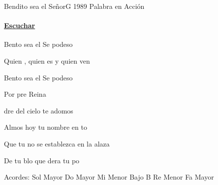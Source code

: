 \documentclass[12pt, spanish]{book}
\newcommand{\NotCCLIed}{\relax}
\begin{document}
    \begin{song}{Bendito sea el Señor}{G}
        {1989} %
        {Palabra en Acción}
        {} %
        {} %
        \ifChordBk
        \paragraph{\mbox{}\hfill\protect\href{https://open.spotify.com/intl-es/track/1zVunzzcTbEairRLe3E6M8}{Escuchar}\mbox{}\hfill}
        \fi


            \begin{SBChorus}
            Bento sea el Se  podeso

            Quien , quien es y quien ven

            Bento sea el Se  podeso

            Por pre Reina
            \end{SBChorus}


            \begin{SBOpGroup}
                dre del cielo te adomos

                Almos hoy tu nombre en to

                Que tu no se establezca en la alaza

                De tu blo que dera tu po
            \end{SBOpGroup}

            \ifChordBk
            \begin{SBOpGroup}
                Acordes:\break
                \upchord{\G}\qquad Sol Mayor \hfill
                \upchord{\C}\qquad Do Mayor \hfill\null\break
                \upchord{\EmB}\qquad Mi Menor Bajo B \hfill
                \upchord{\Dm}\qquad Re Menor \hfill\null\break
                \upchord{\F}\qquad Fa Mayor \hfill\null\break
            \end{SBOpGroup}
            \fi

    \end{song}
\end{document}
